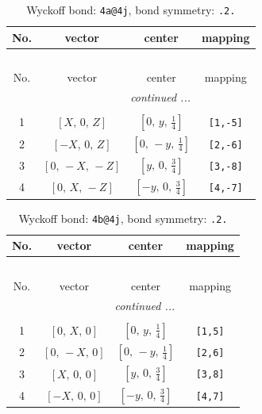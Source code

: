 \documentclass[fleqn,8pt]{jsarticle}
\begin{document}
\begin{longtable}{cccc}
\caption{Wyckoff bond: {\tt 4a@4j}, bond symmetry: {\tt .2.}}
 \\
 \hline \hline
No. & vector & center & mapping \\ \hline \endfirsthead

\multicolumn{3}{l}{\tablename\ \thetable{}} \\
 \hline \hline
No. & vector & center & mapping \\ \hline \endhead

 \hline \hline
\multicolumn{3}{r}{\footnotesize\it continued ...} \\ \endfoot

 \hline \hline
\multicolumn{3}{r}{} \\ \endlastfoot

1 & $\left[ X,\, 0,\, Z \right]$ & $\left[ 0,\, y,\, \frac{1}{4} \right]$ & {\tt [1,-5]} \\ \hline
2 & $\left[ - X,\, 0,\, Z \right]$ & $\left[ 0,\, - y,\, \frac{1}{4} \right]$ & {\tt [2,-6]} \\ \hline
3 & $\left[ 0,\, - X,\, - Z \right]$ & $\left[ y,\, 0,\, \frac{3}{4} \right]$ & {\tt [3,-8]} \\ \hline
4 & $\left[ 0,\, X,\, - Z \right]$ & $\left[ - y,\, 0,\, \frac{3}{4} \right]$ & {\tt [4,-7]} \\
\end{longtable}
\renewcommand{\arraystretch}{1.2}
\begin{longtable}{cccc}
\caption{Wyckoff bond: {\tt 4b@4j}, bond symmetry: {\tt .2.}}
 \\
 \hline \hline
No. & vector & center & mapping \\ \hline \endfirsthead

\multicolumn{3}{l}{\tablename\ \thetable{}} \\
 \hline \hline
No. & vector & center & mapping \\ \hline \endhead

 \hline \hline
\multicolumn{3}{r}{\footnotesize\it continued ...} \\ \endfoot

 \hline \hline
\multicolumn{3}{r}{} \\ \endlastfoot

1 & $\left[ 0,\, X,\, 0 \right]$ & $\left[ 0,\, y,\, \frac{1}{4} \right]$ & {\tt [1,5]} \\ \hline
2 & $\left[ 0,\, - X,\, 0 \right]$ & $\left[ 0,\, - y,\, \frac{1}{4} \right]$ & {\tt [2,6]} \\ \hline
3 & $\left[ X,\, 0,\, 0 \right]$ & $\left[ y,\, 0,\, \frac{3}{4} \right]$ & {\tt [3,8]} \\ \hline
4 & $\left[ - X,\, 0,\, 0 \right]$ & $\left[ - y,\, 0,\, \frac{3}{4} \right]$ & {\tt [4,7]} \\
\end{longtable}
\end{document}
